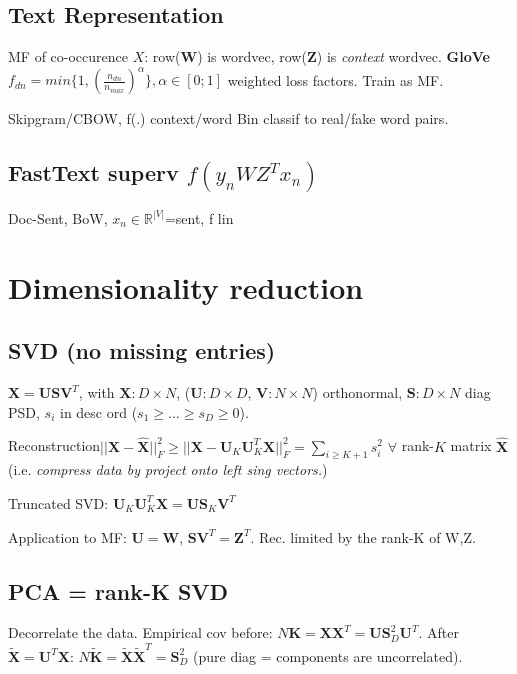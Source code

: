 \subsection{Text Representation}
MF of co-occurence $X$: row($\mathbf{W}$) is wordvec, row($\mathbf{Z}$) is \textit{context} wordvec.
\textbf{GloVe}
$f_{dn} = min\{1,(\frac{n_{dn}}{n_{max}})^\alpha\}, \alpha \in [0;1]$ weighted loss factors. Train as MF.

Skipgram/CBOW, f(.) context/word
Bin classif to real/fake word pairs.
\subsection{FastText superv $f(y_nWZ^Tx_n)$}
Doc-Sent, BoW, $x_n\in\mathbb{R}^{|V|}$=sent, f lin
\section{Dimensionality reduction}
\subsection{SVD (no missing entries)}
$\mathbf{X} = \mathbf{U} \mathbf{S} \mathbf{V}^T$, with $\mathbf{X}: D\times N$, ($\mathbf{U}: D\times D$, $\mathbf{V}: N\times N$) orthonormal, $\mathbf{S}: D\times N$ diag PSD, $s_i$ in desc ord ($s_1 \ge \dots \ge s_D \ge 0$).

Reconstruction\newline $||\mathbf{X}-\mathbf{\hat{X}}||_F^2 \ge ||\mathbf{X}-\mathbf{U}_K\mathbf{U}_K^T\mathbf{X}||_F^2 = \underset{i\ge K+1}{\sum} s_i^2$ 
\newline$\forall$ rank-$K$ matrix $\mathbf{\hat{X}}$ (i.e. \textit{compress data by project onto left sing vectors.})

Truncated SVD: $\mathbf{U}_K \mathbf{U}_K^T \mathbf{X} = \mathbf{U} \mathbf{S}_K \mathbf{V}^T$

Application to MF: $\mathbf{U} = \mathbf{W}$, $\mathbf{S}\mathbf{V}^T = \mathbf{Z}^T$. Rec. limited by the rank-K of W,Z.

\subsection{PCA = rank-K SVD}
Decorrelate the data. Empirical cov before: $N\mathbf{K} = \mathbf{X}\mathbf{X}^T = \mathbf{U}\mathbf{S}_D^2\mathbf{U}^T$.
After $\mathbf{\tilde{X}} = \mathbf{U}^T\mathbf{X}$: $N\mathbf{\tilde{K}} = \mathbf{\tilde{X}}\mathbf{\tilde{X}}^T = \mathbf{S}_D^2$ (pure diag = components are uncorrelated).

